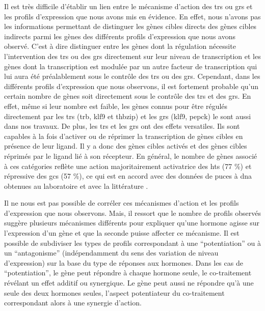 \documentclass[../main.tex]{subfiles}
\begin{document}
	Il est très difficile d'établir un lien entre le mécanisme d'action des \glspl{tr} ou \glspl{gr} et les profils d'expression que nous avons mis en évidence.
	En effet, nous n'avons pas les informations permettant de distinguer les gènes cibles directs des gènes cibles indirects parmi les gènes des différents profils d'expression que nous avons observé.
	C'est à dire distinguer entre les gènes dont la régulation nécessite l'intervention des \glspl{tr} ou des \glspl{gr} directement sur leur niveau de transcription et les gènes dont la transcription est modulée par un autre facteur de transcription qui lui aura été préalablement sous le contrôle des \glspl{tr} ou des \glspl{gr}.
	Cependant, dans les différents profils d'expression que nous observons, il est fortement probable qu'un certain nombre de gènes soit directement sous le contrôle des \glspl{tr} et des \glspl{gr}.
	En effet, même si leur nombre est faible, les gènes connus pour être régulés directement par les \glspl{tr} (\gls{trb}, \gls{klf9} et \gls{thbzip}) et les \glspl{gr} (\gls{klf9}, \gls{pepck}) le sont aussi dans nos travaux.
	De plus, les \glspl{tr} et les \glspl{gr} ont des effets versatiles.
	Ils sont capables à la fois d'activer ou de réprimer la transcription de gènes cibles en présence de leur ligand.
	Il y a donc des gènes cibles activés et des gènes cibles réprimés par le ligand lié à son récepteur.
	En général, le nombre de gènes associé à ces catégories reflète une action majoritairement activatrice des \glspl{ht} (77 \%) et répressive des \glspl{gc} (57 \%), ce qui est en accord avec des données de puces à \gls{dna} obtenues au laboratoire et avec la littérature \citep{Das2006}.
	\par
	Il ne nous est pas possible de corréler ces mécanismes d'action et les profils d'expression que nous observons.
	Mais, il ressort que le nombre de profils observés suggère plusieurs mécanismes différents pour expliquer qu'une hormone agisse sur l'expression d'un gène et que la seconde puisse affecter ce mécanisme.
	Il est possible de subdiviser les types de profils correspondant à une ``potentiation'' ou à un ``antagonisme'' (indépendamment du sens des variation de niveau d'expression) sur la base du type de réponses aux hormones.
	Dans les cas de ``potentiation'', le gène peut répondre à chaque hormone seule, le co-traitement révélant un effet additif ou synergique.
	Le gène peut aussi ne répondre qu'à une seule des deux hormones seules, l'aspect potentiateur du co-traitement correspondant alors à une synergie d'action.
	\par
\end{document}

